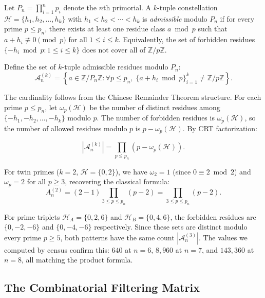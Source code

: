 \documentclass[11pt]{article}
\theoremstyle{remark}
\begin{document}
Let $P_n = \prod_{i=1}^n p_i$ denote the $n$th primorial. A $k$-tuple
constellation $\mathcal{H} = \{h_1, h_2, \ldots, h_k\}$ with
$h_1 < h_2 < \cdots < h_k$ is \emph{admissible} modulo $P_n$ if for
every prime $p \leq p_n$, there exists at least one residue class
$a \bmod p$ such that $a + h_i \not\equiv 0 \pmod{p}$ for all
$1 \leq i \leq k$. Equivalently, the set of forbidden residues
$\{-h_i \bmod p : 1 \leq i \leq k\}$ does not cover all of
$\mathbb{Z}/p\mathbb{Z}$.

Define the set of $k$-tuple admissible residues modulo $P_n$:
\begin{equation}
\mathcal{A}_n^{(k)} = \left\{ a \in \mathbb{Z}/P_n\mathbb{Z} :
\forall p \leq p_n, \; \{a + h_i \bmod p\}_{i=1}^k \neq \mathbb{Z}/p\mathbb{Z}
\right\}.
\end{equation}

The cardinality follows from the Chinese Remainder Theorem structure.
For each prime $p \leq p_n$, let $\omega_p(\mathcal{H})$ be the number
of distinct residues among $\{-h_1, -h_2, \ldots, -h_k\}$ modulo $p$.
The number of forbidden residues is $\omega_p(\mathcal{H})$, so the
number of allowed residues modulo $p$ is $p - \omega_p(\mathcal{H})$.
By CRT factorization:

\begin{equation}
\left|\mathcal{A}_n^{(k)}\right| = \prod_{p \leq p_n}
\left(p - \omega_p(\mathcal{H})\right).
\label{eq:adm-count}
\end{equation}

For twin primes ($k=2$, $\mathcal{H} = \{0, 2\}$), we have
$\omega_2 = 1$ (since $0 \equiv 2 \bmod 2$) and $\omega_p = 2$
for all $p \geq 3$, recovering the classical formula:
\begin{equation}
A_n^{(2)} = (2 - 1) \prod_{3 \leq p \leq p_n} (p - 2)
= \prod_{3 \leq p \leq p_n} (p - 2).
\end{equation}

For prime triplets $\mathcal{H}_A = \{0, 2, 6\}$ and
$\mathcal{H}_B = \{0, 4, 6\}$, the forbidden residues are
$\{0, -2, -6\}$ and $\{0, -4, -6\}$ respectively. Since these sets
are distinct modulo every prime $p \geq 5$, both patterns have the
same count $\left|\mathcal{A}_n^{(3)}\right|$. The values we computed
by census confirm this: $640$ at $n=6$, $8{,}960$ at $n=7$, and
$143{,}360$ at $n=8$, all matching the product formula.

\subsection{The Combinatorial Filtering Matrix}
\end{document}

